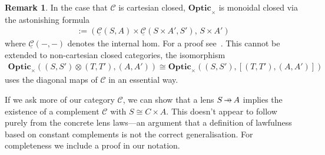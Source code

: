 \documentclass[11pt,letterpaper]{article}
\theoremstyle{plain}
\theoremstyle{definition}
\newtheorem{remark}[theorem]{Remark}
\newcommand{\C}{\mathscr{C}}
\newcommand{\homC}{\underline{\C}}
\newcommand{\Optic}{\mathbf{Optic}}
\newcommand{\hto}{\ensuremath{\,\mathaccent\shortmid\rightarrow\,}}
\begin{document}
\begin{remark}
  In the case that $\C$ is cartesian closed, $\Optic_\times$ is monoidal closed via the astonishing formula
  \begin{align*}
    [(S, S'), (A, A')] := (\homC(S, A) \times \homC(S \times A', S'), \, S \times A')
  \end{align*}
  where $\homC(-, -)$ denotes the internal hom. For a proof see~\cite[Section 1.2]{DialecticaCategories}. This cannot be extended to non-cartesian closed categories, the isomorphism
  \begin{align*}
    \Optic_\times((S, S') \otimes (T, T'), (A, A')) \cong \Optic_\times((S, S'),  [(T, T'), (A, A')])
  \end{align*}
  uses the diagonal maps of $\C$ in an essential way.
\end{remark}

If we ask more of our category $\C$, we can show that a lens $S \hto A$ implies the existence of a complement $\C$ with $S \cong C \times A$.  This doesn't appear to follow purely from the concrete lens laws---an argument that a definition of lawfulness based on constant complements is not the correct generalisation. For completeness we include a proof in our notation.
\end{document}
